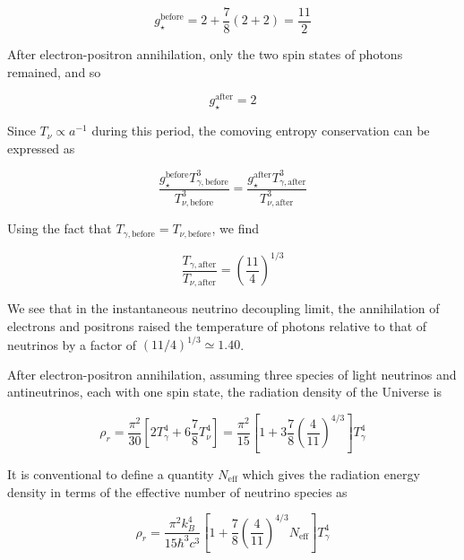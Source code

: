 \begin{equation}
    g_{\star}^{\text{before}}=2+\frac{7}{8}(2+2)=\frac{11}{2} \label{1.55}
\end{equation}

After electron-positron annihilation, only the two spin states of photons remained, and so

\begin{equation}
    g_{\star}^{\text{after}}=2 \label{1.56}
\end{equation}

Since $T_{\nu} \propto a^{-1}$ during this period, the comoving entropy conservation can be expressed as

\begin{equation}
    \frac{g_{\star}^{\text{before}} T_{\gamma, \text{before}}^{3}}{T_{\nu, \text{before}}^{3}}=\frac{g_{\star}^{\text{after}} T_{\gamma, \text{after}}^{3}}{T_{\nu, \text{after}}^{3}} \label{1.57}
\end{equation}

Using the fact that $T_{\gamma, \text{before}}=T_{\nu, \text{before}}$, we find 

\begin{equation}
    \frac{T_{\gamma, \text{after}}}{T_{\nu, \text{after}}}=\left(\frac{11}{4}\right)^{1 / 3} \label{1.58}
\end{equation}

We see that in the instantaneous neutrino decoupling limit, the annihilation of electrons and positrons raised the temperature of photons relative to that of neutrinos by a factor of $(11 / 4)^{1 / 3} \simeq 1.40$.

After electron-positron annihilation, assuming three species of light neutrinos and antineutrinos, each with one spin state, the radiation density of the Universe is

\begin{equation}
    \rho_{r}=\frac{\pi^{2}}{30}\left[2 T_{\gamma}^{4}+6 \frac{7}{8} T_{\nu}^{4}\right]=\frac{\pi^{2}}{15}\left[1+3 \frac{7}{8}\left(\frac{4}{11}\right)^{4 / 3}\right] T_{\gamma}^{4} \label{1.59}
\end{equation}

It is conventional to define a quantity $N_{\text{eff}}$ which gives the radiation energy density in terms of the effective number of neutrino species as

\begin{equation}
    \rho_{r}=\frac{\pi^{2} k_{B}^{4}}{15 \hbar^{3} c^{3}}\left[1+\frac{7}{8}\left(\frac{4}{11}\right)^{4 / 3} N_{\mathrm{eff}}\right] T_{\gamma}^{4} \label{1.60}
\end{equation}

